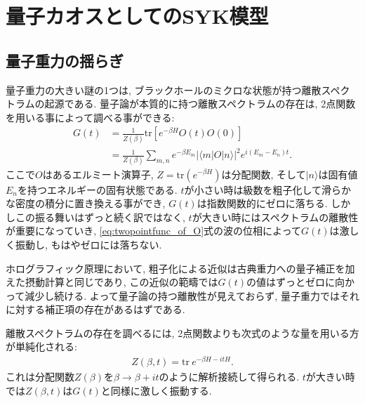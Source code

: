 \section{量子カオスとしてのSYK模型\label{sec:syk_as_quantum_chaos}}

\subsection{量子重力の揺らぎ}
量子重力の大きい謎の1つは, ブラックホールのミクロな状態が持つ離散スペクトラムの起源である. 
量子論が本質的に持つ離散スペクトラムの存在は, 2点関数を用いる事によって調べる事ができる:
\begin{align}
	G(t)
		&= \frac{1}{Z(\beta)}\mathrm{tr}\left[e^{-\beta H}O(t)O(0)\right]\nonumber\\
		&= \frac{1}{Z(\beta)}\sum_{m, n}e^{-\beta E_m}
			|\langle m|O|n \rangle|^2e^{i(E_m - E_n)t}.
	\label{eq:twopointfunc_of_O}
\end{align}
ここで$O$はあるエルミート演算子, $Z = \mathrm{tr}(e^{-\beta H})$は分配関数, 
そして$|n\rangle$は固有値$E_n$を持つエネルギーの固有状態である. 
$t$が小さい時は級数を粗子化して滑らかな密度の積分に置き換える事ができ, $G(t)$は指数関数的にゼロに落ちる. 
しかしこの振る舞いはずっと続く訳ではなく, $t$が大きい時にはスペクトラムの離散性が重要になっていき, 
\eqref{eq:twopointfunc_of_O}式の波の位相によって$G(t)$は激しく振動し, もはやゼロには落ちない. 

ホログラフィック原理において, 粗子化による近似は古典重力への量子補正を加えた摂動計算と同じであり, 
この近似の範疇では$G(t)$の値はずっとゼロに向かって減少し続ける. 
よって量子論の持つ離散性が見えておらず, 量子重力ではそれに対する補正項の存在があるはずである. 

離散スペクトラムの存在を調べるには, 2点関数よりも次式のような量を用いる方が単純化される:
\begin{align}
	Z(\beta, t) = \mathrm{tr}\ e^{-\beta H - itH}.
\end{align}
これは分配関数$Z(\beta)$を$\beta\to\beta + it$のように解析接続して得られる. 
$t$が大きい時では$Z(\beta, t)$は$G(t)$と同様に激しく振動する. 

